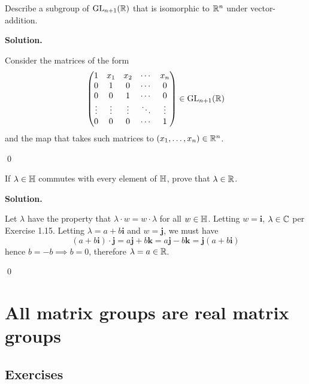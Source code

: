 \documentclass[12pt]{book}
\theoremstyle{definition}
\newenvironment{solution}
{%
  \par\noindent\textbf{Solution.}\quad
}
{%
  \qed\par
}
\begin{document}
\begin{taggedexercise}[Complete]
  Describe a subgroup of $\mathrm{GL}_{n+1}(\mathbb{R})$ that is isomorphic to $\mathbb{R}^n$ under vector-addition.
\end{taggedexercise}

\begin{solution}
  Consider the matrices of the form 
  \[
  \begin{pmatrix}
  1      & x_1    & x_2    & \cdots & x_n \\
  0      & 1      & 0      & \cdots & 0   \\
  0      & 0      & 1      & \cdots & 0   \\
  \vdots & \vdots & \vdots & \ddots & \vdots \\
  0      & 0      & 0      & \cdots & 1
  \end{pmatrix} \in \mathrm{GL}_{n+1}(\mathbb{R})
  \]
  and the map that takes such matrices to $(x_1, \dots , x_n) \in \mathbb{R}^n$.

\end{solution}

\begin{taggedexercise}[Complete]
  If $\lambda \in \mathbb{H}$ commutes with every element of $\mathbb{H}$, prove that $\lambda \in \mathbb{R}$.
\end{taggedexercise}

\begin{solution}
  Let $\lambda$ have the property that $\lambda \cdot w = w \cdot \lambda$ for all $w \in \mathbb{H}$.
  Letting $w = \mathbf{i}$, $\lambda \in \mathbb{C}$ per Exercise 1.15.
  Letting $\lambda = a+b\mathbf{i}$ and $w = \mathbf{j}$, we must have
  \[
    (a+b\mathbf{i}) \cdot \mathbf{j} = a\mathbf{j} + b\mathbf{k} = a\mathbf{j} - b\mathbf{k} = \mathbf{j}(a+b \mathbf{i})
  \]
  hence $b = -b \implies b = 0$, therefore $\lambda = a \in \mathbb{R}$.
  
\end{solution}

\chapter{All matrix groups are real matrix groups}
\section{Exercises}
\end{document}
